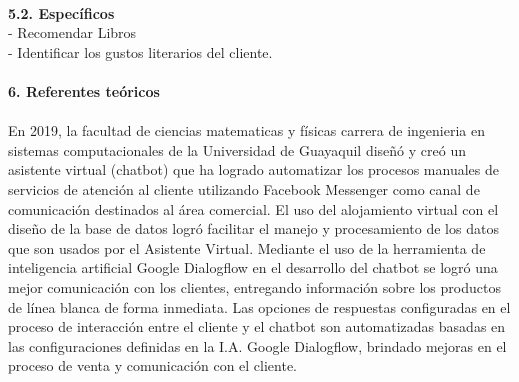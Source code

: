 \begin{flushleft}
\begin{itemize}
\textbf{ }\\

\textbf{5.2.   Específicos}\\

-	Recomendar Libros\\
-	Identificar los gustos literarios del cliente.\\



\textbf{ }\\

\textbf{6.      Referentes teóricos}\\
\textbf{ }\\
En 2019, la facultad de ciencias matematicas y físicas carrera de ingenieria en sistemas computacionales de la Universidad de Guayaquil diseñó y creó un asistente virtual (chatbot) que ha logrado automatizar los procesos manuales de servicios de atención al cliente utilizando Facebook Messenger como canal de comunicación destinados al área comercial. El uso del alojamiento virtual con el diseño de la base de datos logró facilitar el manejo y procesamiento de los datos que son usados por el Asistente Virtual. Mediante el uso de la herramienta de inteligencia artificial Google Dialogflow en el desarrollo del chatbot se logró una mejor comunicación con los clientes, entregando información sobre los productos de línea blanca de forma inmediata. Las opciones de respuestas configuradas en el proceso de interacción entre el cliente y el chatbot son automatizadas basadas en las configuraciones definidas en la I.A. Google Dialogflow, brindado mejoras en el proceso de venta y comunicación con el cliente.\\
\textbf{ }\\

\end{itemize}
\end{flushleft}
